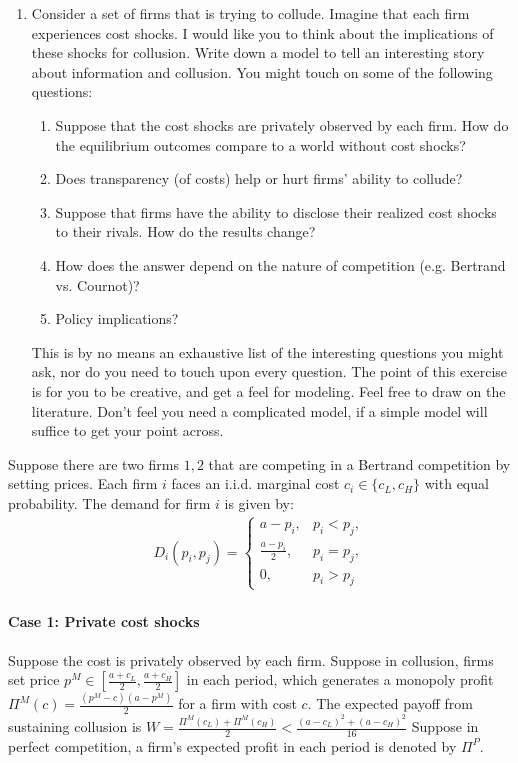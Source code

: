 \documentclass[12pt]{article}
\begin{document}
\begin{enumerate}
\item Consider a set of firms that is trying to collude. Imagine that each firm experiences cost shocks. I would like you to think about the implications of these shocks for collusion. Write down a model to tell an interesting story about information and collusion. You might touch on some of the following questions:
    \begin{enumerate}
        \item Suppose that the cost shocks are privately observed by each firm. How do the equilibrium outcomes compare to a world without cost shocks?
        \item Does transparency (of costs) help or hurt firms’ ability to collude?
        \item Suppose that firms have the ability to disclose their realized cost shocks to their rivals. How do the results change?
        \item How does the answer depend on the nature of competition (e.g. Bertrand vs. Cournot)?
        \item Policy implications?
    \end{enumerate}
    This is by no means an exhaustive list of the interesting questions you might ask, nor do you need to touch upon every question. The point of this exercise is for you to be creative, and get a feel for modeling. Feel free to draw on the literature. Don't feel you need a complicated model, if a simple model will suffice to get your point across.
\end{enumerate}

Suppose there are two firms $1,2$ that are competing in a Bertrand competition by setting prices. Each firm $i$ faces an i.i.d. marginal cost $c_i\in \{c_L,c_H\}$ with equal probability. The demand for firm $i$ is given by:
\begin{equation}
    \begin{aligned}
        D_i(p_i,p_j)=\left\{\begin{matrix}
            a-p_i,& p_i<p_j,\\
            \frac{a-p_i}{2},& p_i=p_j,\\
            0,& p_i>p_j
        \end{matrix}\right.
    \end{aligned}
    \nonumber
\end{equation}

\paragraph{Case 1: Private cost shocks}
Suppose the cost is privately observed by each firm. Suppose in collusion, firms set price $p^M\in\left[\frac{a+c_L}{2},\frac{a+c_H}{2}\right]$ in each period, which generates a monopoly profit $\Pi^M(c)=\frac{(p^M-c)(a-p^M)}{2}$ for a firm with cost $c$. The expected payoff from sustaining collusion is $W=\frac{\Pi^M(c_L)+\Pi^M(c_H)}{2}<\frac{(a-c_L)^2+(a-c_H)^2}{16}$  Suppose in perfect competition, a firm's expected profit in each period is denoted by $\Pi^P$.
\end{document}
